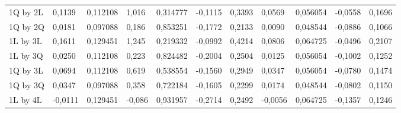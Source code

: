 \begin{table}[H]
{\begin{tabular}{lllllllllll}
\rowcolor[HTML]{FFFFFF} 
1Q by 2L       & 0,1139                          & 0,112108                        & 1,016                           & 0,314777                        & -0,1115                         & 0,3393                          & 0,0569                          & 0,056054                        & -0,0558                         & 0,1696                          \\
\rowcolor[HTML]{FFFFFF} 
1Q by 2Q       & 0,0181                          & 0,097088                        & 0,186                           & 0,853251                        & -0,1772                         & 0,2133                          & 0,0090                          & 0,048544                        & -0,0886                         & 0,1066                          \\
\rowcolor[HTML]{FFFFFF} 
1L by 3L       & 0,1611                          & 0,129451                        & 1,245                           & 0,219332                        & -0,0992                         & 0,4214                          & 0,0806                          & 0,064725                        & -0,0496                         & 0,2107                          \\
\rowcolor[HTML]{FFFFFF} 
1L by 3Q       & 0,0250                          & 0,112108                        & 0,223                           & 0,824482                        & -0,2004                         & 0,2504                          & 0,0125                          & 0,056054                        & -0,1002                         & 0,1252                          \\
\rowcolor[HTML]{FFFFFF} 
1Q by 3L       & 0,0694                          & 0,112108                        & 0,619                           & 0,538554                        & -0,1560                         & 0,2949                          & 0,0347                          & 0,056054                        & -0,0780                         & 0,1474                          \\
\rowcolor[HTML]{FFFFFF} 
1Q by 3Q       & 0,0347                          & 0,097088                        & 0,358                           & 0,722184                        & -0,1605                         & 0,2299                          & 0,0174                          & 0,048544                        & -0,0802                         & 0,1150                          \\
\rowcolor[HTML]{FFFFFF} 
1L by 4L       & -0,0111                         & 0,129451                        & -0,086                          & 0,931957                        & -0,2714                         & 0,2492                          & -0,0056                         & 0,064725                        & -0,1357                         & 0,1246                          \\

\end{tabular}}
\end{table}
